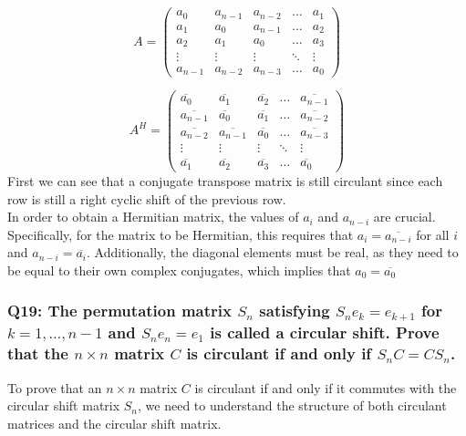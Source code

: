 \documentclass[8pt]{article}
\begin{document}
\begin{equation}
A = \begin{pmatrix}
a_0 & a_{n-1} & a_{n-2} & \ldots & a_1 \\
a_1 & a_0 & a_{n-1} & \ldots & a_2 \\
a_2 & a_1 & a_0 & \ldots & a_3 \\
\vdots & \vdots & \vdots & \ddots & \vdots \\
a_{n-1} & a_{n-2} & a_{n-3} & \ldots & a_0
\end{pmatrix}
\end{equation}

\begin{equation}
A^H = \begin{pmatrix}
\overline{a_0} & \overline{a_1} & \overline{a_2} & \ldots & \overline{a_{n-1}} \\
\overline{a_{n-1}} & \overline{a_0} & \overline{a_1} & \ldots & \overline{a_{n-2}} \\
\overline{a_{n-2}} & \overline{a_{n-1}} & \overline{a_0} & \ldots & \overline{a_{n-3}} \\
\vdots & \vdots & \vdots & \ddots & \vdots \\
\overline{a_1} & \overline{a_2} & \overline{a_3} & \ldots & \overline{a_0}
\end{pmatrix}
\end{equation}
First we can see that a conjugate transpose matrix is still circulant since each
row is still a right cyclic shift of the previous row.\\

In order to obtain a Hermitian matrix, the values of $a_i$ and $a_{n-i}$ are crucial. Specifically, for the matrix to be Hermitian, this requires that $a_i = \overline{a_{n-i}}$ for all $i$ and $a_{n-i} = \overline{a_i}$. Additionally, the diagonal elements must be real, as they need to be equal to their own complex conjugates, which implies that $a_{0} = \overline{a_0}$ \\

\subsubsection*{Q19:
The permutation matrix \(S_n\) satisfying \(S_n e_k = e_{k+1}\) for \(k = 1, \ldots, n-1\) and \(S_n e_n = e_1\) is called a circular shift. Prove that the \(n \times n\) matrix \(C\) is circulant if and only if \(S_n C = C S_n\).}

To prove that an \(n \times n\) matrix \(C\) is circulant if and only if it commutes with the circular shift matrix \(S_n\), we need to understand the structure of both circulant matrices and the circular shift matrix.
\end{document}
